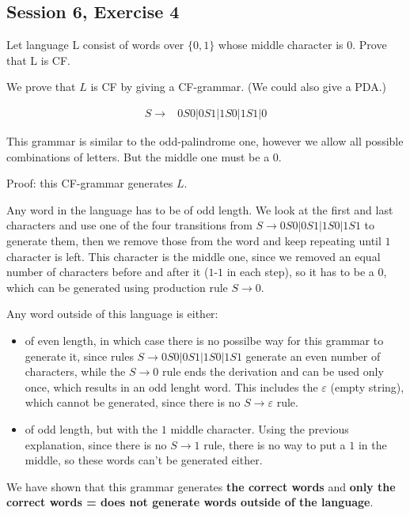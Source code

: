 \subsection {Session 6, Exercise 4}


Let language L consist of words over $\{0,1\}$ whose middle character is $0$. Prove that L is CF.


We prove that $L$ is CF by giving a CF-grammar. (We could also give a PDA.)

\begin{align*}
    S \rightarrow& 0S0 | 0S1 | 1S0 | 1S1 | 0
\end{align*}

This grammar is similar to the odd-palindrome one, however we allow all possible combinations of letters. But the middle one must be a $0$.

Proof: this CF-grammar generates $L$.

Any word in the language has to be of odd length. We look at the first and last characters and use one of the four transitions from $S \rightarrow 0S0 | 0S1 | 1S0 | 1S1$ to generate them, then we remove those from the word and keep repeating until $1$ character is left. This character is the middle one, since we removed an equal number of characters before and after it ($1$-$1$ in each step), so it has to be a $0$, which can be generated using production rule $S \rightarrow 0$.

Any word outside of this language is either:
\begin{itemize}
    \item of even length, in which case there is no possilbe way for this grammar to generate it, since rules  $S \rightarrow 0S0 | 0S1 | 1S0 | 1S1$ generate an even number of characters, while the  $S \rightarrow 0$ rule ends the derivation and can be used only once, which results in an odd lenght word. This includes the $\varepsilon$ (empty string), which cannot be generated, since there is no $S \rightarrow \varepsilon$ rule.
    \item of odd length, but with the $1$ middle character. Using the previous explanation, since there is no  $S \rightarrow 1$ rule, there is no way to put a $1$ in the middle, so these words can't be generated either.
\end{itemize}

We have shown that this grammar generates \textbf{the correct words} and \textbf{only the correct words = does not generate words outside of the language}.